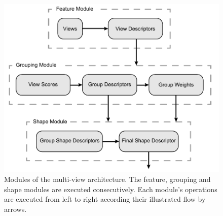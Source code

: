 \begin{figure}
	\centering
	\includegraphics[]{images/multi_view_architecture.pdf}
	\caption{Modules of the multi-view architecture. The feature, grouping and shape modules are executed consecutively. Each module's operations are executed from left to right according their illustrated flow by arrows.}
	\label{fig:architecture-modules}
\end{figure}




